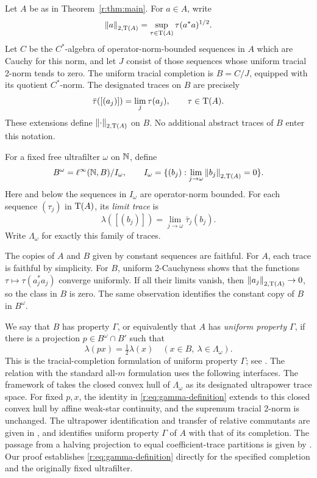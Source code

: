 Let \(A\) be as in Theorem~\ref{r:thm:main}. For \(a\in A\), write
\[
 \left\|a\right\|_{2,\operatorname T(A)}
 =\sup_{\tau\in\operatorname T(A)}\tau(a^*a)^{1/2}.
\]
Let \(C\) be the \(C^*\)-algebra of operator-norm-bounded sequences in \(A\)
which are Cauchy for this norm, and let \(J\) consist of those sequences
whose uniform tracial 2-norm tends to zero. The uniform tracial
completion is \(B=C/J\), equipped with its quotient \(C^*\)-norm. The
designated traces on \(B\) are precisely
\[
 \bar\tau([(a_j)])=\lim_j\tau(a_j),\qquad \tau\in\operatorname T(A).
\]
These extensions define \(\left\|\cdot\right\|_{2,\operatorname T(A)}\) on \(B\).
No additional abstract traces of \(B\) enter this notation.

For a fixed free ultrafilter \(\omega\) on \(\mathbb N\), define
\begin{equation}\label{r:eq:ultrapower}
 B^\omega=\ell^\infty(\mathbb N,B)/I_\omega,\qquad
 I_\omega=\{(b_j):\lim_{j\to\omega}\left\|b_j\right\|_{2,\operatorname T(A)}=0\}.
\end{equation}
Here and below the sequences in \(I_\omega\) are operator-norm bounded.
For each sequence \((\tau_j)\) in \(\operatorname T(A)\), its \emph{limit trace} is
\begin{equation}\label{r:eq:limit-trace}
 \lambda([(b_j)])=\lim_{j\to\omega}\bar\tau_j(b_j).
\end{equation}
Write \(\Lambda_\omega\) for exactly this family of traces.

The copies of \(A\) and \(B\) given by constant sequences are faithful.
For \(A\), each trace is faithful by simplicity. For \(B\), uniform
2-Cauchyness shows that the functions
\(\tau\mapsto\tau(a_j^*a_j)\) converge uniformly. If all their limits
vanish, then \(\left\|a_j\right\|_{2,\operatorname T(A)}\to0\), so the class in \(B\) is zero.
The same observation identifies the constant copy of \(B\) in
\(B^\omega\).

We say that \(B\) has property \(\Gamma\), or equivalently that \(A\)
has \emph{uniform property \(\Gamma\)}, if there is a projection
\(p\in B^\omega\cap B'\) such that
\begin{equation}\label{r:eq:gamma-definition}
 \lambda(px)=\tfrac12\lambda(x)
 \quad(x\in B,\ \lambda\in\Lambda_\omega).
\end{equation}
This is the tracial-completion formulation of uniform property
\(\Gamma\); see \cite[Definition~16]{STW}. The relation with the standard
all-$m$ formulation uses the following interfaces. The framework of
\cite{CCEGSTW} takes the closed convex hull of \(\Lambda_\omega\) as its
designated ultrapower trace space. For fixed \(p,x\), the identity in
\eqref{r:eq:gamma-definition} extends to this closed convex hull by affine
weak-star continuity, and the supremum tracial 2-norm is unchanged.
The ultrapower identification and transfer
of relative commutants are given in \cite[Proposition~5.7]{CCEGSTW}, and
\cite[Proposition~5.20]{CCEGSTW} identifies uniform property $\Gamma$ of
$A$ with that of its completion. The passage from a halving projection to
equal coefficient-trace partitions is given by
\cite[Proposition~5.23 and Remark~5.24]{CCEGSTW}.
Our proof establishes \eqref{r:eq:gamma-definition} directly for the
specified completion and the originally fixed ultrafilter.
